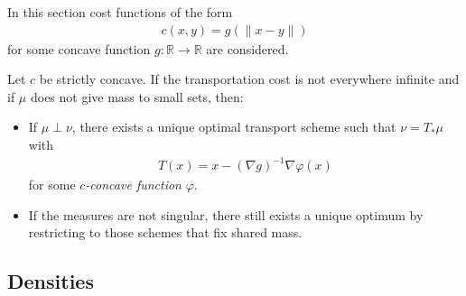     In this section cost functions of the form
    \begin{gather}
        c(x,y) = g(\|x-y\|)
    \end{gather}
    for some concave function $g:\mathbb{R}\rightarrow\mathbb{R}$ are considered.

    \begin{property}
        Let $c$ be strictly concave. If the transportation cost is not everywhere infinite and if $\mu$ does not give mass to small sets, then:
        \begin{itemize}
            \item If $\mu\perp\nu$, there exists a unique optimal transport scheme such that $\nu = T_\ast\mu$ with
            \begin{gather}
                T(x) = x - (\nabla g)^{-1}\nabla\varphi(x)
            \end{gather}
            for some \textit{$c$-concave function} $\varphi$.
            \item If the measures are not singular, there still exists a unique optimum by restricting to those schemes that fix shared mass.
        \end{itemize}
    \end{property}

\subsection{Densities}

